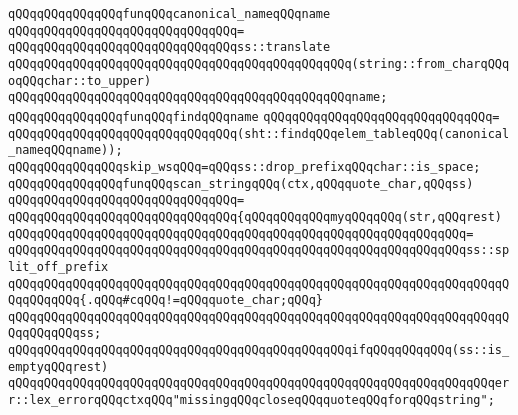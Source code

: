 \newline
\newline
\verb|qQQqqQQqqQQqqQQqfunqQQqcanonical_nameqQQqname|\newline
\verb|qQQqqQQqqQQqqQQqqQQqqQQqqQQqqQQq=|\newline
\verb|qQQqqQQqqQQqqQQqqQQqqQQqqQQqqQQqss::translate|\newline
\verb|qQQqqQQqqQQqqQQqqQQqqQQqqQQqqQQqqQQqqQQqqQQqqQQq(string::from_charqQQqoqQQqchar::to_upper)|\newline
\verb|qQQqqQQqqQQqqQQqqQQqqQQqqQQqqQQqqQQqqQQqqQQqqQQqname;|\newline
\newline
\newline
\verb|qQQqqQQqqQQqqQQqfunqQQqfindqQQqname|\newline
\verb|qQQqqQQqqQQqqQQqqQQqqQQqqQQqqQQq=|\newline
\verb|qQQqqQQqqQQqqQQqqQQqqQQqqQQqqQQq(sht::findqQQqelem_tableqQQq(canonical_nameqQQqname));|\newline
\newline
\newline
\verb|qQQqqQQqqQQqqQQqskip_wsqQQq=qQQqss::drop_prefixqQQqchar::is_space;|\newline
\newline
\verb|qQQqqQQqqQQqqQQqfunqQQqscan_stringqQQq(ctx,qQQqquote_char,qQQqss)|\newline
\verb|qQQqqQQqqQQqqQQqqQQqqQQqqQQqqQQq=|\newline
\verb|qQQqqQQqqQQqqQQqqQQqqQQqqQQqqQQq{qQQqqQQqqQQqmyqQQqqQQq(str,qQQqrest)|\newline
\verb|qQQqqQQqqQQqqQQqqQQqqQQqqQQqqQQqqQQqqQQqqQQqqQQqqQQqqQQqqQQqqQQq=|\newline
\verb|qQQqqQQqqQQqqQQqqQQqqQQqqQQqqQQqqQQqqQQqqQQqqQQqqQQqqQQqqQQqqQQqss::split_off_prefix|\newline
\verb|qQQqqQQqqQQqqQQqqQQqqQQqqQQqqQQqqQQqqQQqqQQqqQQqqQQqqQQqqQQqqQQqqQQqqQQqqQQqqQQq{.qQQq#cqQQq!=qQQqquote_char;qQQq}|\newline
\verb|qQQqqQQqqQQqqQQqqQQqqQQqqQQqqQQqqQQqqQQqqQQqqQQqqQQqqQQqqQQqqQQqqQQqqQQqqQQqqQQqss;|\newline
\newline
\verb|qQQqqQQqqQQqqQQqqQQqqQQqqQQqqQQqqQQqqQQqqQQqqQQqifqQQqqQQqqQQq(ss::is_emptyqQQqrest)|\newline
\verb|qQQqqQQqqQQqqQQqqQQqqQQqqQQqqQQqqQQqqQQqqQQqqQQqqQQqqQQqqQQqqQQqqQQqerr::lex_errorqQQqctxqQQq"missingqQQqcloseqQQqquoteqQQqforqQQqstring";|\newline
